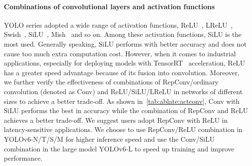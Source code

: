 \documentclass[10pt,twocolumn,letterpaper]{article}
\begin{document}
  \paragraph{Combinations of convolutional layers and activation functions}
 YOLO series adopted a wide range of activation functions, ReLU~\cite{nair2010rectified}, LReLU~\cite{maas2013rectifier}, Swish~\cite{ramachandran2017searching}, SiLU~\cite{elfwing2018sigmoid}, Mish~\cite{misra2019mish} and so on. Among these activation functions, SiLU is the most used. Generally speaking, SiLU performs with better accuracy and does not cause too much extra computation cost. However, when it comes to industrial applications, especially for deploying models with TensorRT~\cite{tensorrt} acceleration, ReLU has a greater speed advantage because of its fusion into convolution. 
 Moreover, we further verify the effectiveness of combinations of RepConv/ordinary convolution (denoted as Conv) and ReLU/SiLU/LReLU in networks of different sizes to achieve a better trade-off. As shown in~\cref{tab:ablate:actconv}, Conv with SiLU performs the best in accuracy while the combination of RepConv and ReLU achieves a better trade-off. We suggest users adopt RepConv with ReLU in latency-sensitive applications. We choose to use RepConv/ReLU combination in YOLOv6-N/T/S/M for higher inference speed and use the Conv/SiLU combination in the large model YOLOv6-L to speed up training and improve performance.
\end{document}

